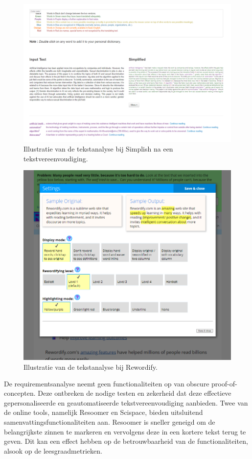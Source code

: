 \begin{figure}[H]
	\includegraphics[width=\linewidth]{img/simplish-output.png}
	\caption{Illustratie van de tekstanalyse bij Simplish na een tekstvereenvoudiging.}
	\label{img:simplish-output}
\end{figure}

\begin{figure}[H]
	\includegraphics[width=\linewidth]{img/scholarcy-attempt.png}
	\caption{Illustratie van de tekstanalyse bij Rewordify.}
	\label{img:scholarcy}
\end{figure}

De requirementsanalyse neemt geen functionaliteiten op van obscure proof-of-concepten. Deze ontbreken de nodige testen en zekerheid dat deze effectieve gepersonaliseerde en geautomatiseerde tekstvereenvoudiging aanbieden. Twee van de online tools, namelijk Resoomer en Scispace, bieden uitsluitend samenvattingsfunctionaliteiten aan. Resoomer is sneller geneigd om de belangrijkste zinnen te markeren en vervolgens deze in een kortere tekst terug te geven. Dit kan een effect hebben op de betrouwbaarheid van de functionaliteiten, alsook op de leesgraadmetrieken.

